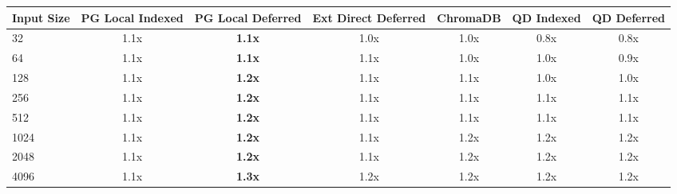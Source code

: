 \begin{tabular}{lcccccc}
\toprule
\textbf{Input Size} & \textbf{PG Local Indexed} & \textbf{PG Local Deferred} & \textbf{Ext Direct Deferred} & \textbf{ChromaDB} & \textbf{QD Indexed} & \textbf{QD Deferred} \\
\midrule
32 & 1.1x & \textbf{1.1x} & 1.0x & 1.0x & 0.8x & 0.8x \\
64 & 1.1x & \textbf{1.1x} & 1.1x & 1.0x & 1.0x & 0.9x \\
128 & 1.1x & \textbf{1.2x} & 1.1x & 1.1x & 1.0x & 1.0x \\
256 & 1.1x & \textbf{1.2x} & 1.1x & 1.1x & 1.1x & 1.1x \\
512 & 1.1x & \textbf{1.2x} & 1.1x & 1.1x & 1.1x & 1.1x \\
1024 & 1.1x & \textbf{1.2x} & 1.1x & 1.2x & 1.2x & 1.2x \\
2048 & 1.1x & \textbf{1.2x} & 1.1x & 1.2x & 1.2x & 1.2x \\
4096 & 1.1x & \textbf{1.3x} & 1.2x & 1.2x & 1.2x & 1.2x \\
\bottomrule
\end{tabular}
